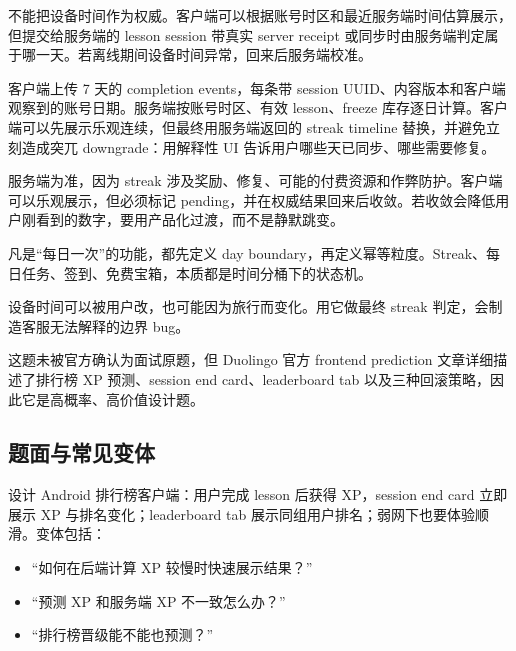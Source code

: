 \begin{followup}
不能把设备时间作为权威。客户端可以根据账号时区和最近服务端时间估算展示，但提交给服务端的 lesson session 带真实 server receipt 或同步时由服务端判定属于哪一天。若离线期间设备时间异常，回来后服务端校准。
\end{followup}

\begin{followup}[“离线 7 天回来怎么算？”]
客户端上传 7 天的 completion events，每条带 session UUID、内容版本和客户端观察到的账号日期。服务端按账号时区、有效 lesson、freeze 库存逐日计算。客户端可以先展示乐观连续，但最终用服务端返回的 streak timeline 替换，并避免立刻造成突兀 downgrade：用解释性 UI 告诉用户哪些天已同步、哪些需要修复。
\end{followup}

\begin{followup}
服务端为准，因为 streak 涉及奖励、修复、可能的付费资源和作弊防护。客户端可以乐观展示，但必须标记 pending，并在权威结果回来后收敛。若收敛会降低用户刚看到的数字，要用产品化过渡，而不是静默跳变。
\end{followup}

\begin{idea}[可迁移心法]
凡是“每日一次”的功能，都先定义 day boundary，再定义幂等粒度。Streak、每日任务、签到、免费宝箱，本质都是时间分桶下的状态机。
\end{idea}

\begin{pitfall}[直接信设备时间]
设备时间可以被用户改，也可能因为旅行而变化。用它做最终 streak 判定，会制造客服无法解释的边界 bug。
\end{pitfall}


\srcinferred 这题未被官方确认为面试原题，但 \srcofficial Duolingo 官方 frontend prediction 文章详细描述了排行榜 XP 预测、session end card、leaderboard tab 以及三种回滚策略，因此它是高概率、高价值设计题。

\subsection{题面与常见变体}

设计 Android 排行榜客户端：用户完成 lesson 后获得 XP，session end card 立即展示 XP 与排名变化；leaderboard tab 展示同组用户排名；弱网下也要体验顺滑。变体包括：

\begin{itemize}
  \item “如何在后端计算 XP 较慢时快速展示结果？”
  \item “预测 XP 和服务端 XP 不一致怎么办？”
  \item “排行榜晋级能不能也预测？”
\end{itemize}

